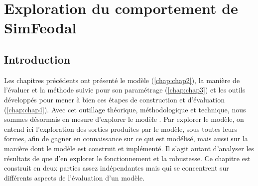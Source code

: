 \setcounter{chapter}{4}
\graphicspath{{chap5/}}


\chapter{Exploration du comportement de SimFeodal}
\label{chap:chap5}
%
\setcounter{minitocdepth}{2}
\vfill
{}
\minitoc
{}
\clearpage
{}

\section*{Introduction}

Les chapitres précédents ont présenté le modèle \simfeodal{} (\cref{chap:chap2}), la manière de l'évaluer et la méthode suivie pour son paramétrage (\cref{chap:chap3}) et les outils développés pour mener à bien ces étapes de construction et d'évaluation (\cref{chap:chap4}).
Avec cet outillage théorique, méthodologique et technique, nous sommes désormais en mesure d'explorer le modèle \simfeodal{}.
Par \og explorer le modèle\fg{}, on entend ici l'exploration des sorties produites par le modèle, sous toutes leurs formes, afin de gagner en connaissance sur ce qui est modélisé, mais aussi sur la manière dont le modèle est construit et implémenté.
Il s'agit autant d'analyser les \og résultats\fg{} de \simfeodal{} que d'en explorer le fonctionnement et la robustesse.
Ce chapitre est construit en deux parties assez indépendantes mais qui se concentrent sur différents aspects de l'évaluation d'un modèle.

